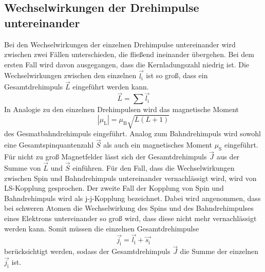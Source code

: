 \subsection{Wechselwirkungen der Drehimpulse untereinander}
Bei den Wechselwirkungen der einzelnen Drehimpulse untereinander wird zwischen zwei Fällen unterschieden, die fließend ineinander übergehen. Bei dem ersten Fall wird davon ausgegangen, dass die Kernladungszahl niedrig ist. Die Wechselwirkungen zwischen den einzelnen $\vec{l_\text{i}}$ ist so groß, dass ein Gesamtdrehimpuls $\vec{L}$ eingeführt werden kann.
\begin{equation}
  \vec{L} = \sum \vec{l_\text{i}}
  \label{eqn:L}
\end{equation}
In Analogie zu den einzelnen Drehimpulsen wird das magnetische Moment
\begin{equation}
  |\mu_\text{L}| = \mu_\text{B} \sqrt{L(L+1)}
  \label{magL}
\end{equation}
des Gesmatbahndrehimpuls eingeführt. Analog zum Bahndrehimpuls wird sowohl eine Gesamtspinquantenzahl $\vec{S}$ als auch ein magnetisches Moment $\mu_\text{S}$ eingeführt. Für nicht zu groß Magnetfelder lässt sich der Gesamtdrehimpuls $\vec{J}$ aus der Summe von $\vec{L}$ und $\vec{S}$ einführen. Für den Fall, dass die Wechselwirkungen zwischen Spin und Bahndrehimpuls untereinander vernachlässigt wird, wird von LS-Kopplung gesprochen.
Der zweite Fall der Kopplung von Spin und Bahndrehimpuls wird als j-j-Kopplung bezeichnet. Dabei wird angenommen, dass bei schweren Atomen die Wechselwirkung des Spins und des Bahndrehimpulses eines Elektrons untereinander so groß wird, dass diese nicht mehr vernachlässigt werden kann. Somit müssen die einzelnen Gesamtdrehimpulse
\begin{equation}
  \vec{j_\text{i}} = \vec{l_\text{i}} + \vec{s_\text{i}}
  \label{eqn:j}
\end{equation}
berücksichtigt werden, sodass der Gesamtdrehimpuls $\vec{J}$ die Summe der einzelnen $\vec{j_\text{i}}$ ist.

